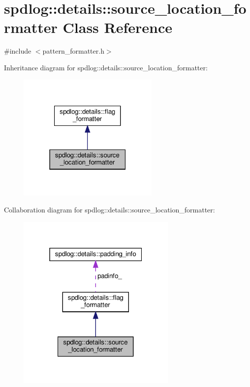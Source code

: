 \hypertarget{classspdlog_1_1details_1_1source__location__formatter}{}\section{spdlog\+:\+:details\+:\+:source\+\_\+location\+\_\+formatter Class Reference}
\label{classspdlog_1_1details_1_1source__location__formatter}


{\ttfamily \#include $<$pattern\+\_\+formatter.\+h$>$}



Inheritance diagram for spdlog\+:\+:details\+:\+:source\+\_\+location\+\_\+formatter\+:
\nopagebreak
\begin{figure}[H]
\begin{center}
\leavevmode
\includegraphics[width=195pt]{classspdlog_1_1details_1_1source__location__formatter__inherit__graph}
\end{center}
\end{figure}


Collaboration diagram for spdlog\+:\+:details\+:\+:source\+\_\+location\+\_\+formatter\+:
\nopagebreak
\begin{figure}[H]
\begin{center}
\leavevmode
\includegraphics[width=220pt]{classspdlog_1_1details_1_1source__location__formatter__coll__graph}
\end{center}
\end{figure}
